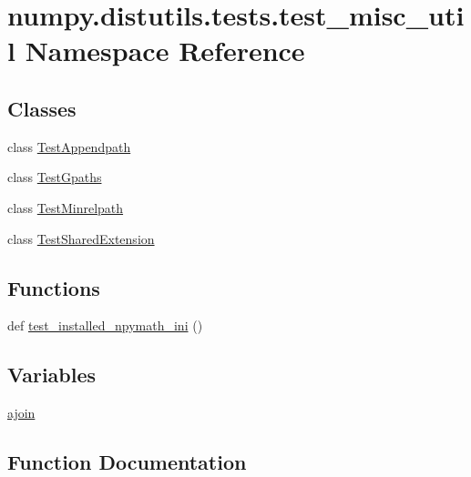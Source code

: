 \hypertarget{namespacenumpy_1_1distutils_1_1tests_1_1test__misc__util}{}\section{numpy.\+distutils.\+tests.\+test\+\_\+misc\+\_\+util Namespace Reference}
\label{namespacenumpy_1_1distutils_1_1tests_1_1test__misc__util}
\subsection*{Classes}
\begin{DoxyCompactItemize}
\item 
class \hyperlink{classnumpy_1_1distutils_1_1tests_1_1test__misc__util_1_1TestAppendpath}{Test\+Appendpath}
\item 
class \hyperlink{classnumpy_1_1distutils_1_1tests_1_1test__misc__util_1_1TestGpaths}{Test\+Gpaths}
\item 
class \hyperlink{classnumpy_1_1distutils_1_1tests_1_1test__misc__util_1_1TestMinrelpath}{Test\+Minrelpath}
\item 
class \hyperlink{classnumpy_1_1distutils_1_1tests_1_1test__misc__util_1_1TestSharedExtension}{Test\+Shared\+Extension}
\end{DoxyCompactItemize}
\subsection*{Functions}
\begin{DoxyCompactItemize}
\item 
def \hyperlink{namespacenumpy_1_1distutils_1_1tests_1_1test__misc__util_a4ec8a8a33b934e6ebeded47f9ad2eabd}{test\+\_\+installed\+\_\+npymath\+\_\+ini} ()
\end{DoxyCompactItemize}
\subsection*{Variables}
\begin{DoxyCompactItemize}
\item 
\hyperlink{namespacenumpy_1_1distutils_1_1tests_1_1test__misc__util_a64e7d0416ffb69ff6ddf6ff82f461a2a}{ajoin}
\end{DoxyCompactItemize}


\subsection{Function Documentation}
\mbox{\label{namespacenumpy_1_1distutils_1_1tests_1_1test__misc__util_a4ec8a8a33b934e6ebeded47f9ad2eabd}} 

